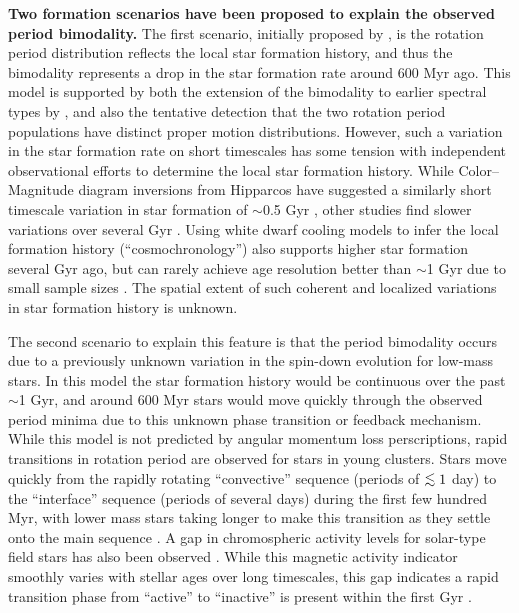 \documentclass[12pt]{article}
\def\lesssim{\mathrel{\hbox{\rlap{\hbox{\lower3pt\hbox{$\sim$}}}\hbox{\raise2pt\hbox{$<$}}}}}
\begin{document}
{\bf Two formation scenarios have been proposed to explain the observed period bimodality.} The first scenario, initially proposed by \citet{mcquillan2013}, is the rotation period distribution reflects the local star formation history, and thus the bimodality represents a drop in the star formation rate around 600 Myr ago. This model is supported by both the extension of the bimodality to earlier spectral types by \citet{davenport2017}, and also the tentative detection that the two rotation period populations have distinct proper motion distributions. However, such a variation in the star formation rate on short timescales has some tension with independent observational efforts to determine the local star formation history. While Color--Magnitude diagram inversions from Hipparcos have suggested a similarly short timescale variation in star formation of  $\sim$0.5 Gyr \citep{hernandez2000}, other studies find slower variations over several Gyr \citep[e.g.][]{cignoni2006}. Using white dwarf cooling models to infer the local formation history (``cosmochronology'') also supports higher star formation several Gyr ago, but can rarely achieve age resolution better than $\sim$1 Gyr due to small sample sizes \citep{tremblay2014}. The spatial extent of such coherent and localized variations in star formation history is unknown.


The second scenario to explain this feature is that the period bimodality occurs due to a previously unknown variation in the spin-down evolution for low-mass stars. In this model the star formation history would be continuous over the past $\sim$1 Gyr, and around 600 Myr stars would move quickly through the observed period minima due to this unknown phase transition or feedback mechanism. While this model is not predicted by angular momentum loss perscriptions, rapid transitions in rotation period are observed for stars in young clusters. Stars move quickly from the rapidly rotating ``convective'' sequence (periods of $\lesssim1$ day) to the ``interface'' sequence (periods of several days) during the first few hundred Myr, with lower mass stars taking longer to make this transition as they settle onto the main sequence \citep{barnes2003}. A gap in chromospheric activity levels for solar-type field stars has also been observed \citep{vaughan1980}. While this magnetic activity indicator smoothly varies with stellar ages over long timescales, this gap indicates a rapid transition phase from ``active'' to ``inactive'' is present within the first Gyr \citep{pace2009}.
\end{document}
